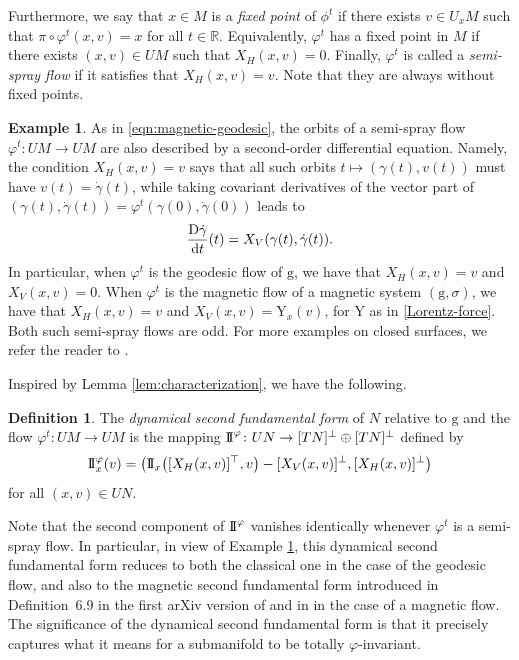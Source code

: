 \documentclass[10pt,a4paper]{amsart}
\newcommand{\g}{\mathrm{g}}
\newcommand{\Y}{\mathrm{Y}}
\numberwithin{equation}{section}
\theoremstyle{definition}
\newtheorem{Definition}[Theorem]{Definition}
\newtheorem{Example}[Theorem]{Example}
\begin{document}
Furthermore, we say that $x\in M$ is a \emph{fixed point} of $\phi^t$ if there exists $v \in U_xM$ such that $\pi \circ \varphi^t(x,v) = x$ for all $t \in \mathbb{R}$. Equivalently, $\varphi^t$ has a fixed point in $M$ if there exists $(x,v) \in UM$ such that $X_H(x,v) = 0$. Finally, $\varphi^t$ is called a \emph{semi-spray flow} if it satisfies that $X_H(x,v) = v$. Note that they are always without fixed points.

\begin{Example}\label{example:odd-flows}
 As in \eqref{eqn:magnetic-geodesic}, the orbits of a semi-spray flow \mbox{$\varphi^t \colon UM\to UM$} are also described by a second-order differential equation. Namely, the condition $X_H(x,v) = v$ says that all such orbits $t\mapsto (\gamma(t),v(t))$ must have $v(t) = \dot{\gamma}(t)$, while taking covariant derivatives of the vector part of $(\gamma(t),\dot{\gamma}(t)) = \varphi^t(\gamma(0),\dot{\gamma}(0))$ leads to
 \begin{equation}\label{Dc'/dt=XV}
 \frac{{\rm D}\dot{\gamma}}{{\rm d}t}(t)= X_V(\gamma(t),\dot{\gamma}(t)).
 \end{equation}
 In particular, when $\varphi^t$ is the geodesic flow of $\g$, we have that $X_H(x,v)=v$ and \mbox{$X_V(x,v)=0$}. When $\varphi^t$ is the magnetic flow of a magnetic system $(\g,\sigma)$, we have that $X_H(x,v)=v$ and \mbox{$X_V(x,v)=\Y_x(v)$}, for $\Y$ as in \eqref{Lorentz-force}. Both such semi-spray flows are odd. For more examples on closed surfaces, we refer the reader to \cite{cuesta2025thermostats}.
\end{Example}

Inspired by Lemma \ref{lem:characterization}, we have the following.

\begin{Definition}\label{dyn-2FF}
 The \emph{dynamical second fundamental form} of $N$ relative to $\g$ and the flow $\varphi^t\colon UM\to UM$ is the mapping ${\rm I\!I}^{\varphi}\colon UN\to [TN]^\perp \oplus [TN]^\perp$ defined by \[{\rm I\!I }^{\varphi}_x(v) = \bigl({\rm I\!I}_x\bigl([X_H(x,v)]^\top, v\bigr) - [X_V(x,v)]^\perp,
 [X_H(x,v)]^\perp\bigr)\] for all $(x,v)\in UN$.
\end{Definition}

Note that the second component of ${\rm I\!I}^\varphi$ vanishes identically whenever $\varphi^t$ is a semi-spray flow. In particular, in view of Example \ref{example:odd-flows}, this dynamical second fundamental form reduces to both the classical one in the case of the geodesic flow, and also to the magnetic second fundamental form introduced in Definition~6.9 in the first arXiv version of \cite{ABM_2025} and in \cite[Definition 4.1]{terek2025submanifold} in the case of a magnetic flow. The significance of the dynamical second fundamental form is that it precisely captures what it means for a submanifold to be totally $\varphi$-invariant.
\end{document}
